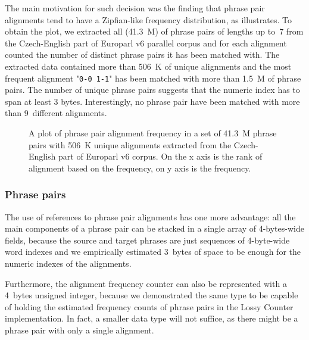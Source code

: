 The main motivation for such decision was the finding that phrase pair alignments tend to
have a Zipfian-like frequency distribution, as  illustrates.
To obtain the plot, we extracted all (41.3~M) of phrase pairs of lengths up to~7 from
the Czech-English part of Europarl v6 parallel corpus and for each alignment counted
the number of distinct phrase pairs it has been matched with.
The extracted data contained more than 506~K of unique alignments and the most frequent
alignment "\texttt{0-0 1-1}" has been matched with more than 1.5~M of phrase pairs.
The number of unique phrase pairs suggests that the numeric index has to span at least
3 bytes.
Interestingly, no phrase pair have been matched with more than 9~different alignments.

\begin{figure}[ht]
  
  \caption{
    A plot of phrase pair alignment frequency in a set of 41.3~M phrase pairs with
    506~K unique alignments extracted from the Czech-English part of Europarl v6 corpus.
    On the x axis is the rank of alignment based on the frequency, on y axis is the frequency.
  }
  \label{fig:alignment-dist}
\end{figure}

\subsubsection*{Phrase pairs}

The use of references to phrase pair alignments has one more advantage: all the main
components of a phrase pair can be stacked in a single array of 4-bytes-wide fields,
because the source and target phrases are just sequences of 4-byte-wide word indexes
and we empirically estimated 3~bytes of space to be enough for the numeric indexes
of the alignments.

Furthermore, the alignment frequency counter can also be represented with a 4~bytes
unsigned integer, because we demonstrated the same type to be capable of holding
the estimated frequency counts of phrase pairs in the Lossy Counter implementation.
In fact, a smaller data type will not suffice, as there might be a phrase pair with
only a single alignment.

